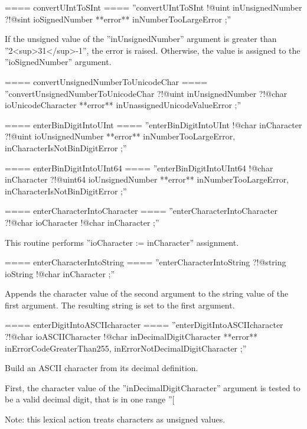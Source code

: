 {==== convertUIntToSInt ====
''convertUIntToSInt !@uint inUnsignedNumber ?!@sint ioSignedNumber **error** inNumberTooLargeError ;''

If the unsigned value of the ''inUnsignedNumber'' argument is greater than ''2<sup>31</sup>-1'', the error is raised. Otherwise, the value is assigned to the ''ioSignedNumber'' argument.

==== convertUnsignedNumberToUnicodeChar ====
''convertUnsignedNumberToUnicodeChar ?!@uint inUnsignedNumber ?!@char ioUnicodeCharacter **error** inUnassignedUnicodeValueError ;''

==== enterBinDigitIntoUInt ====
''enterBinDigitIntoUInt !@char inCharacter ?!@uint ioUnsignedNumber **error** inNumberTooLargeError, inCharacterIsNotBinDigitError ;''

==== enterBinDigitIntoUInt64 ====
''enterBinDigitIntoUInt64 !@char inCharacter ?!@uint64 ioUnsignedNumber **error** inNumberTooLargeError, inCharacterIsNotBinDigitError ;''

==== enterCharacterIntoCharacter ====
''enterCharacterIntoCharacter ?!@char ioCharacter !@char inCharacter ;''

This routine performs ''ioCharacter := inCharacter'' assignment.

==== enterCharacterIntoString ====
''enterCharacterIntoString ?!@string ioString !@char inCharacter ;''

Appends the character value of the second argument to the string value of the first argument. The resulting string is set to the first argument.

==== enterDigitIntoASCIIcharacter ====
''enterDigitIntoASCIIcharacter ?!@char ioASCIICharacter !@char inDecimalDigitCharacter **error** inErrorCodeGreaterThan255, inErrorNotDecimalDigitCharacter ;''

Build an ASCII character from its decimal definition.

First, the character value of the ''inDecimalDigitCharacter'' argument is tested to be a valid decimal digit, that is in one range ''[%

Note: this lexical action treats characters as unsigned values.

}
